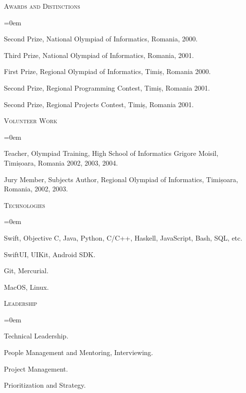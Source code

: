 \documentclass[11pt]{article}
\begin{document}
\vspace{0.12in}

\noindent
\textcolor{Primary}{{\large \textsc{Awards and Distinctions}}}
\begin{list}{}{\leftmargin=0em}
  \setlength{\itemsep}{1pt}
  \setlength{\parskip}{0pt}
  \setlength{\parsep}{0pt}
  \item{Second Prize, National Olympiad of Informatics, Romania, 2000.}
  \item{Third Prize, National Olympiad of Informatics, Romania, 2001.}
  \item{First Prize, Regional Olympiad of Informatics, Timiș, Romania 2000.}
  \item{Second Prize, Regional Programming Contest, Timiș, Romania 2001.}
  \item{Second Prize, Regional Projects Contest, Timiș, Romania 2001.}
\end{list}

\vspace{0.12in}

\noindent
\textcolor{Primary}{{\large \textsc{Volunteer Work}}}
\begin{list}{}{\leftmargin=0em}
  \setlength{\itemsep}{1pt}
  \setlength{\parskip}{0pt}
  \setlength{\parsep}{0pt}
  \item{Teacher, Olympiad Training, High School of Informatics Grigore Moisil, Timișoara, Romania 2002, 2003, 2004.}
  \item{Jury Member, Subjects Author, Regional Olympiad of Informatics, Timișoara, Romania, 2002, 2003.}
\end{list}

\vspace{0.12in}

\noindent
\textcolor{Primary}{{\large \textsc{Technologies}}}
\begin{list}{}{\leftmargin=0em}
  \setlength{\itemsep}{1pt}
  \setlength{\parskip}{0pt}
  \setlength{\parsep}{0pt}
  \item{Swift, Objective C, Java, Python, C/C++, Haskell, JavaScript, Bash, SQL, etc.}
  \item{SwiftUI, UIKit, Android SDK.}
  \item{Git, Mercurial.}
  \item{MacOS, Linux.}
\end{list}

\vspace{0.12in}

\noindent
\textcolor{Primary}{{\large \textsc{Leadership}}}
\begin{list}{}{\leftmargin=0em}
  \setlength{\itemsep}{1pt}
  \setlength{\parskip}{0pt}
  \setlength{\parsep}{0pt}
  \item{Technical Leadership.}
  \item{People Management and Mentoring, Interviewing.}
  \item{Project Management.}
  \item{Prioritization and Strategy.}
\end{list}
\end{document}
